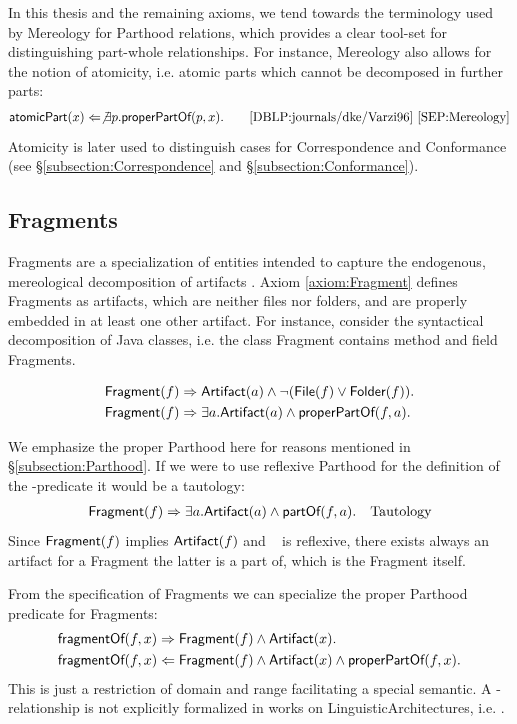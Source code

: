 In this thesis and the remaining axioms, we tend towards the terminology used by \gls{Mereology} for \gls{Parthood} relations, which provides a clear tool-set for distinguishing part-whole relationships.
For instance, \gls{Mereology} also allows for the notion of atomicity, i.e. atomic parts which cannot be decomposed in further parts:
\begin{align*}
\textsf{atomicPart}(x)
\Leftarrow
\not \exists p.\textsf{properPartOf}(p,x).
\qquad\text{\cite{DBLP:journals/dke/Varzi96} \cite{SEP:Mereology}}
\end{align*}
Atomicity is later used to distinguish cases for \gls{Correspondence} and \gls{Conformance} (see §\ref{subsection:Correspondence} and §\ref{subsection:Conformance}).

\subsection{Fragments}
\label{subsection:Fragments}
\Glspl{Fragment} are a specialization of entities intended to capture the endogenous, mereological decomposition of artifacts \cite{DBLP:conf/modelsward/HeinzLV17}.
Axiom \ref{axiom:Fragment} defines  \glspl{Fragment} as artifacts, which are neither files nor folders, and are properly embedded in at least one other artifact.
For instance, consider the syntactical decomposition of \gls{Java} classes, i.e. the class \gls{Fragment} contains method and field \glspl{Fragment}.
\begin{axiom}[\Fragment]
\label{axiom:Fragment}
\begin{align*}
&\textsf{Fragment}(f) 
\Rightarrow
\textsf{Artifact}(a) \wedge \neg(\textsf{File}(f) \vee \textsf{Folder}(f)).\\
&\textsf{Fragment}(f) 
\Rightarrow 
\exists a.\textsf{Artifact}(a) \wedge \textsf{properPartOf}(f,a).
\end{align*}
\end{axiom}
We emphasize the proper \gls{Parthood} here for reasons mentioned in §\ref{subsection:Parthood}.
If we were to use reflexive \gls{Parthood} for the definition of the \Fragment-predicate it would be a tautology:
\begin{align*}
&\textsf{Fragment}(f) 
\Rightarrow 
\exists a.\textsf{Artifact}(a) \wedge \textsf{partOf}(f,a).
&\text{Tautology}
\end{align*}
Since $\textsf{Fragment}(f)$ implies $\textsf{Artifact}(f)$ and \partOf~ is reflexive, there exists always an artifact for a \gls{Fragment} the latter is a part of, which is the \gls{Fragment} itself.

From the specification of \glspl{Fragment} we can specialize the proper \gls{Parthood} predicate for \glspl{Fragment}:
\begin{align*}
&\textsf{fragmentOf}(f,x) 
\Rightarrow
\textsf{Fragment}(f) \wedge \textsf{Artifact}(x).\\
&\textsf{fragmentOf}(f,x) 
\Leftarrow
\textsf{Fragment}(f) \wedge \textsf{Artifact}(x) \wedge \textsf{properPartOf}(f,x).
\end{align*}
This is just a restriction of domain and range facilitating a special semantic.
A \fragmentOf-relationship is not explicitly formalized in works on \glspl{LinguisticArchitecture}, i.e. \cite{DBLP:conf/sle/Lammel16} \cite{DBLP:conf/modelsward/HeinzLV17}.

